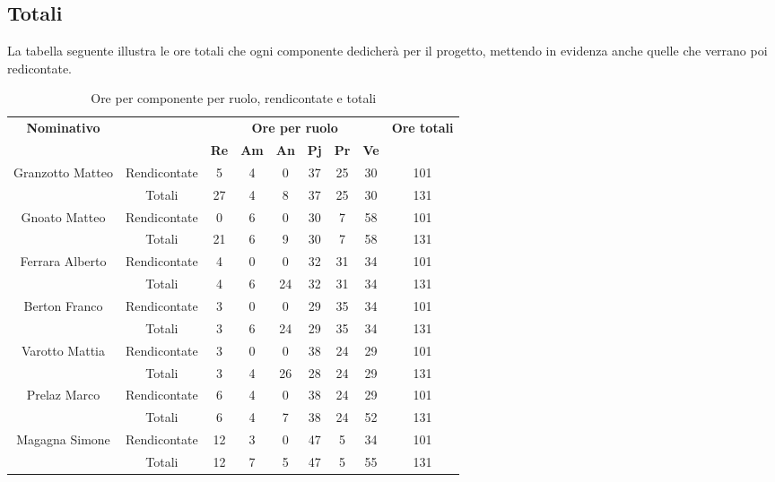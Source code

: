 \subsection{Totali}
La tabella seguente illustra le ore totali che ogni componente dedicherà per il progetto, mettendo in evidenza anche quelle che verrano poi redicontate.
\begin{table}[H]
	\begin{center}
		\begin{tabular}{|c|c|c|c|c|c|c|c|c|}
			\hline
			\multirow{2}{*}{\textbf{Nominativo}} & & \multicolumn{6}{c|}{\textbf{Ore per ruolo}} & \multirow{2}{*}{\textbf{Ore totali}} \\
			& & \textbf{Re} & \textbf{Am} & \textbf{An} & \textbf{Pj} & \textbf{Pr} & \textbf{Ve} & \\
			\hline
			\hline
			\multirow{2}{*}{Granzotto Matteo}	&	Rendicontate	&	5	&	4	&	0	&	37	&	25	&	30	&	101	\\
			\cline{2-9}
			&	Totali			&	27	&	4	&	8	&	37	&	25	&	30	&	131	\\
			\hline
			\hline
			\multirow{2}{*}{Gnoato Matteo}	&	Rendicontate	&	0	&	6	&	0	&	30	&	7	&	58	&	101	\\
			\cline{2-9}
			&	Totali			&	21	&	6	&	9	&	30	&	7	&	58	&	131	\\
			\hline
			\hline
			\multirow{2}{*}{Ferrara Alberto}	&	Rendicontate	&	4	&	0	&	0	&	32	&	31	&  34	&	101	\\
			\cline{2-9}
			&	Totali			&	4	&	6	&	24	&	32	&	31	& 	34	&	131	\\
			\hline
			\hline
			\multirow{2}{*}{Berton Franco}		&	Rendicontate	&	3	&	0	&	0	&	29	&	35	&  34	&	101	\\
			\cline{2-9}
			&	Totali			&	3	&	6	&	24	&	29	&	35	& 	34	&	131	\\
			\hline
			\hline
			\multirow{2}{*}{Varotto Mattia}	&	Rendicontate	&	3	&	0	&	0	&	38	&	24	& 	29	&	101	\\
			\cline{2-9}
			&	Totali			&	3	&	4	&	26	&	28	&	24	& 	29	&	131	\\
			\hline
			\hline
			\multirow{2}{*}{Prelaz Marco}	&	Rendicontate	&	6	&	4	&	0	&	38	&	24	& 	29	&	101	\\
			\cline{2-9}
			&	Totali			&	6	&	4	&	7	&	38	&	24	& 	52	&	131	\\
			\hline
			\hline
			\multirow{2}{*}{Magagna Simone}		&	Rendicontate	&	12	&	3	&	0	&	47	&	5	& 	34	&	101	\\
			\cline{2-9}
			&	Totali			&	12	&	7	&	5	&	47	&	5	& 	55	&	131	\\
			\hline
		\end{tabular}
	\end{center}
	\caption{Ore per componente per ruolo, rendicontate e totali}
\end{table}
